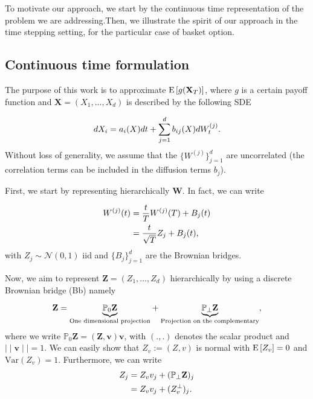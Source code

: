 To motivate our approach, we start  by the continuous time representation of the problem we are addressing.Then, we illustrate the spirit of our approach in the time stepping setting, for the particular case of basket option.
\subsection{Continuous time formulation}

The purpose of this work is to approximate $\mathrm{E}\left[g(\mathbf{X}_T)\right]$, where $g$ is a certain payoff function and $\mathbf{X}=(X_1, \dots, X_d)$ is described by the following SDE

\begin{equation}\label{eq:SDE_interest}
dX_i=a_i(X) dt + \sum_{j=1}^d b_{ij}(X) dW_t^{(j)} .
\end{equation}
Without  loss of generality, we assume that the $\{W^{(j)}\}_{j=1}^d$ are uncorrelated (the correlation terms can be included  in the diffusion terms $b_j$).

First, we start by representing hierarchically $\mathbf{W}$. In fact, we can write 

\begin{align}
W^{(j)}(t)&= \frac{t}{T} W^{(j)}(T)+B_j(t) \nonumber\\
&= \frac{t}{\sqrt{T}} Z_j+B_j(t),
\end{align}
with $Z_j \sim \mathcal{N}(0,1)$ iid and $\{B_j\}_{j=1}^d$ are the Brownian bridges.

Now, we aim to represent $\mathbf{Z}=(Z_1,\dots,Z_d)$ hierarchically by using a discrete Brownian bridge (Bb) namely

\begin{equation}\label{eq:smoothing_decomposition}
\mathbf{Z}= \underset{\text{One dimensional projection}}{\underbrace{\mathbb{P}_0 \mathbf{Z}}} +  \underset{\text{Projection on the complementary}} {\underbrace{\mathbb{P}_{\perp} \mathbf{Z}}},
\end{equation} 
where we write $\mathbb{P}_0 \mathbf{Z}=(\mathbf{Z}, \mathbf{v}) \mathbf{v}$, with $(.,.)$ denotes the scalar product and $\mid \mid \mathbf{v} \mid \mid=1$. We can easily show that $Z_v:=(Z,v)$ is normal with $\mathrm{E}\left[Z_v\right]=0$ and $\text{Var}(Z_v)=1$. Furthermore, we can write
\begin{align}\label{eq:smoothing_decomposition_componentwise}
Z_j&=Z_v v_j+ (\mathbb{P}_{\perp} \mathbf{Z})_j\nonumber \\
&=Z_v v_j+ (Z_v^\perp)_j .
\end{align}

